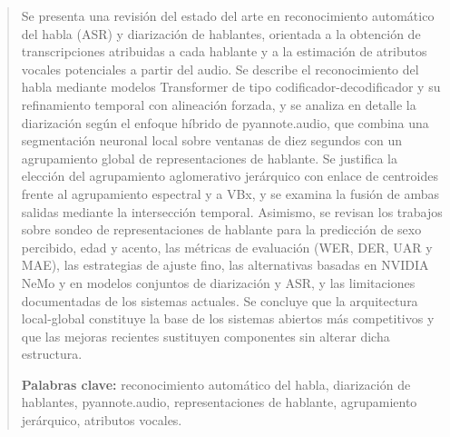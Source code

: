 \documentclass[11pt,a4paper]{article}
\begin{document}
\begin{abstract}
\noindent
Se presenta una revisión del estado del arte en reconocimiento automático del habla (ASR) y diarización de hablantes, orientada a la obtención de transcripciones atribuidas a cada hablante y a la estimación de atributos vocales potenciales a partir del audio. Se describe el reconocimiento del habla mediante modelos Transformer de tipo codificador-decodificador y su refinamiento temporal con alineación forzada, y se analiza en detalle la diarización según el enfoque híbrido de pyannote.audio, que combina una segmentación neuronal local sobre ventanas de diez segundos con un agrupamiento global de representaciones de hablante. Se justifica la elección del agrupamiento aglomerativo jerárquico con enlace de centroides frente al agrupamiento espectral y a VBx, y se examina la fusión de ambas salidas mediante la intersección temporal. Asimismo, se revisan los trabajos sobre sondeo de representaciones de hablante para la predicción de sexo percibido, edad y acento, las métricas de evaluación (WER, DER, UAR y MAE), las estrategias de ajuste fino, las alternativas basadas en NVIDIA NeMo y en modelos conjuntos de diarización y ASR, y las limitaciones documentadas de los sistemas actuales. Se concluye que la arquitectura local-global constituye la base de los sistemas abiertos más competitivos y que las mejoras recientes sustituyen componentes sin alterar dicha estructura.

\medskip
\noindent\textbf{Palabras clave:} reconocimiento automático del habla, diarización de hablantes, pyannote.audio, representaciones de hablante, agrupamiento jerárquico, atributos vocales.
\end{abstract}
\end{document}
